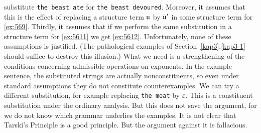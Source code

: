 substitute {\tt the beast ate} for {\tt the beast devoured}. 
Moreover, it assumes that this is the effect of replacing a 
structure term $\mathfrak{u}$ by $\mathfrak{u}'$ in some structure term for 
\eqref{ex:569}.  Thirdly, it assumes that if we perform the same 
substitution in a structure term for \eqref{ex:5611} we get 
\eqref{ex:5612}. Unfortunately, none of these assumptions is justified. 
(The pathological examples of Section~\ref{kap3}.\ref{kap3-1} should suffice 
to destroy this illusion.) What we need is a strengthening of the 
conditions concerning admissible operations on exponents. In the 
example sentence, the substituted strings are actually nonconstituents, 
so even under standard assumptions they do not constitute 
counterexamples. We can try a different substitution, for example 
replacing {\tt the meat} by $\varepsilon$. This is a constituent 
substitution under the ordinary analysis. But this does not save 
the argument, for we do not know which grammar underlies the examples. 
It is not clear that Tarski's Principle is a good principle. But the 
argument against it is fallacious. 

